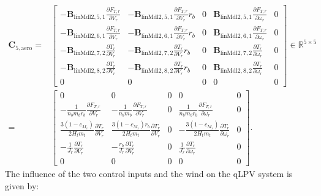     \newpage
    \begin{align*}
        \mathbf{C}_{5,\text{aero}} =& 
        \begin{bmatrix}
            - \bm{B}_{\text{linMdl2}, 5, 1} \frac{\partial F_{T,r}}{\partial V_r} & - \bm{B}_{\text{linMdl2}, 5, 1} \frac{\partial F_{T,r}}{\partial V_r} r_b & 0 & \bm{B}_{\text{linMdl2}, 5, 1} \frac{\partial F_{T,r}}{\partial \omega_r} & 0\\
            - \bm{B}_{\text{linMdl2}, 6, 1} \frac{\partial F_{T,r}}{\partial V_r} & -\bm{B}_{\text{linMdl2}, 6, 1} \frac{\partial F_{T,r}}{\partial V_r} r_b & 0 & \bm{B}_{\text{linMdl2}, 6, 1} \frac{\partial F_{T,r}}{\partial \omega_r} & 0\\
            - \bm{B}_{\text{linMdl2}, 7, 2} \frac{\partial T_r}{\partial V_r} & -\bm{B}_{\text{linMdl2}, 7, 2} \frac{\partial T_r}{\partial V_r} r_b & 0 & \bm{B}_{\text{linMdl2}, 7, 2} \frac{\partial T_r}{\partial \omega_r} & 0\\
            -\bm{B}_{\text{linMdl2}, 8, 2} \frac{\partial T_r}{\partial V_r} & -\bm{B}_{\text{linMdl2}, 8, 2} \frac{\partial T_r}{\partial V_r} r_b & 0 & \bm{B}_{\text{linMdl2}, 8, 2} \frac{\partial T_r}{\partial \omega_r} & 0\\
            0 & 0 & 0 & 0 & 0
        \end{bmatrix} \in \mathbb{R}^{5 \times 5}  \\
        =&
        \begin{bmatrix}
            0 & 0 & 0 & 0 & 0 \\
            -\frac{1}{n_b m_b r_b} \frac{\partial F_{T,r}}{\partial V_r} & -\frac{1}{n_b m_b} \frac{\partial F_{T,r}}{\partial V_r} & 0 & \frac{1}{n_b m_b r_b} \frac{\partial F_{T,r}}{\partial \omega_r} & 0 \\
            \frac{3(1-c_{M_x})}{2 H_t m_t} \frac{\partial T_r}{\partial V_r} & \frac{3(1-c_{M_x}) r_b}{2 H_t m_t} \frac{\partial T_r}{\partial V_r} & 0 & -\frac{3(1-c_{M_x})}{2 H_t m_t} \frac{\partial T_r}{\partial \omega_r} & 0 \\
            -\frac{1}{J_r} \frac{\partial T_r}{\partial V_r} & -\frac{r_b}{J_r} \frac{\partial T_r}{\partial V_r} & 0 & \frac{1}{J_r} \frac{\partial T_r}{\partial \omega_r} & 0 \\
            0 & 0 & 0 & 0 & 0
        \end{bmatrix}.
    \end{align*}
    The influence of the two control inputs and the wind on the qLPV system is given by:

